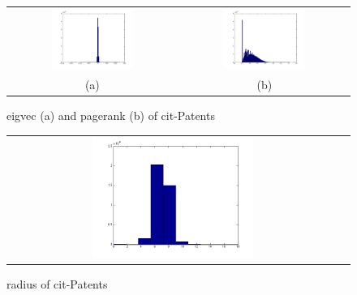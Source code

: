 \begin{figure}[htbf]
\begin{center}
\begin{tabular}{cc}
     \includegraphics[width=0.5\textwidth]{FIG/cit_result/eigvec.png} &
     \includegraphics[width=0.5\textwidth]{FIG/cit_result/pagerank.png} \\
    (a) & (b) 
\end{tabular}
\caption{ eigvec (a) and pagerank (b) of cit-Patents}
\label{fig:results}
\end{center}
\end{figure}

\begin{figure}[htbf]
\begin{center}
\begin{tabular}{cc}
     \includegraphics[width=0.5\textwidth]{FIG/cit_result/radius.png} \\
\end{tabular}
\caption{ radius of cit-Patents}
\label{fig:results}
\end{center}
\end{figure}

